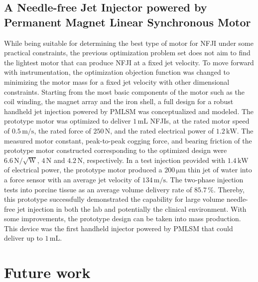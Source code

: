     
    \subsection{A Needle-free Jet Injector powered by Permanent Magnet Linear Synchronous Motor}
    
        
        While being suitable for determining the best type of motor for NFJI under some practical constraints, the previous optimization problem set does not aim to find the lightest motor that can produce \acs{NFJI} at a fixed jet velocity. To move forward with instrumentation, the optimization objection function was changed to minimizing the motor mass for a fixed jet velocity with other dimensional constraints. Starting from the most basic components of the motor such as the coil winding, the magnet array and the iron shell, a full design for a robust handheld jet injection powered by \acs{PMLSM} was conceptualized and modeled. The prototype motor was optimized to deliver $1\,\mathrm{mL}$ NFJIs, at the rated motor speed of $0.5\,\mathrm{m/s}$, the rated force of $250\,\mathrm{N}$, and the rated electrical power of $1.2\,\mathrm{kW}$. The measured motor constant, peak-to-peak cogging force, and bearing friction of the prototype motor constructed corresponding to the optimized design were $6.6\,\mathrm{N/\sqrt{W}}$, $4\,\mathrm{N}$ and $4.2\,\mathrm{N}$, respectively. In a test injection provided with $1.4\,\mathrm{kW}$ of electrical power, the prototype motor produced a $200\,\mathrm{\mu m}$ thin jet of water into a force sensor with an average jet velocity of $134\,\mathrm{m/s}$. The two-phase injection tests into porcine tissue as an average volume delivery rate of $85.7\,\%$. Thereby, this prototype successfully demonstrated the capability for large volume needle-free jet injection in both the lab and potentially the clinical environment. With some improvements, the prototype design can be taken into mass production. This device was the first handheld injector powered by \acs{PMLSM} that could deliver up to $1\,\mathrm{mL}$. 
        
        
\section{Future work}                  


